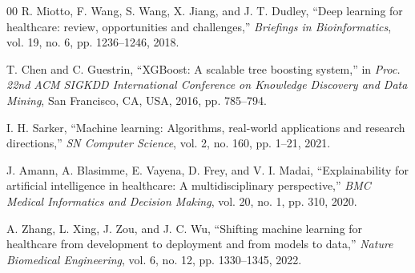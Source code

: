 \documentclass[conference]{IEEEtran}
\begin{document}
\begin{thebibliography}{00}
 R. Miotto, F. Wang, S. Wang, X. Jiang, and J. T. Dudley, ``Deep learning for healthcare: review, opportunities and challenges,'' \textit{Briefings in Bioinformatics}, vol. 19, no. 6, pp. 1236--1246, 2018.

 T. Chen and C. Guestrin, ``XGBoost: A scalable tree boosting system,'' in \textit{Proc. 22nd ACM SIGKDD International Conference on Knowledge Discovery and Data Mining}, San Francisco, CA, USA, 2016, pp. 785--794.

 I. H. Sarker, ``Machine learning: Algorithms, real-world applications and research directions,'' \textit{SN Computer Science}, vol. 2, no. 160, pp. 1--21, 2021.

 J. Amann, A. Blasimme, E. Vayena, D. Frey, and V. I. Madai, ``Explainability for artificial intelligence in healthcare: A multidisciplinary perspective,'' \textit{BMC Medical Informatics and Decision Making}, vol. 20, no. 1, pp. 310, 2020.

 A. Zhang, L. Xing, J. Zou, and J. C. Wu, ``Shifting machine learning for healthcare from development to deployment and from models to data,'' \textit{Nature Biomedical Engineering}, vol. 6, no. 12, pp. 1330--1345, 2022.
\end{thebibliography}
\end{document}
